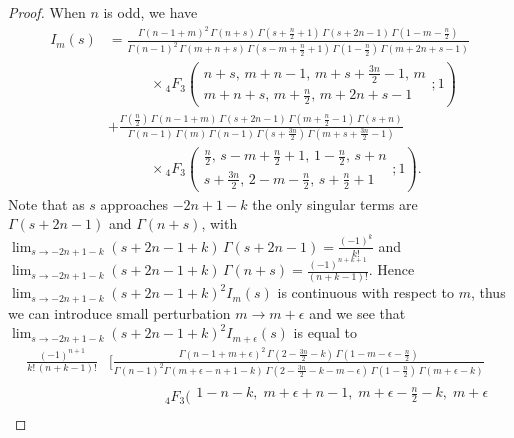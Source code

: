 \documentclass{article}
\theoremstyle{boldremark}
\renewcommand\[{\begin{equation}}
\renewcommand\]{\end{equation}}
\theoremstyle{definition}
\numberwithin{equation}{section}
\begin{document}
\begin{proof}
    When $n$ is odd, we have 
    \begin{align} 
I_m(s) &= \frac{\Gamma(n-1 + m)^2 \, \Gamma(n+s) \, \Gamma(s+\frac{n}{2}+1) \, \Gamma(s+2n-1) \, \Gamma(1 - m - \frac{n}{2})}{\Gamma(n-1)^2\,\Gamma(m+n+s) \, \Gamma(s - m + \frac{n}{2} + 1) \, \Gamma(1 - \frac{n}{2}) \, \Gamma(m + 2n + s - 1)} \nonumber \\
&\qquad \quad \times {}_4F_3 \left( \begin{matrix} n + s, \, m + n - 1, \, m + s + \frac{3n}{2} - 1, \, m \\ m + n + s, \, m + \frac{n}{2}, \, m + 2n + s - 1 \end{matrix} ; 1 \right) \nonumber \\[1em]
& + \frac{\Gamma(\frac{n}{2}) \, \Gamma(n-1+m)\, \Gamma(s+2n-1) \, \Gamma(m+\frac{n}{2}-1) \, \Gamma(s+n)}{\Gamma(n-1)\,\Gamma(m) \, \Gamma(n-1) \, \Gamma(s+\frac{3n}{2}) \, \Gamma(m+s+\frac{3n}{2}-1)} \nonumber \\
&\qquad \quad \times {}_4F_3 \left( \begin{matrix} \frac{n}{2}, \, s - m + \frac{n}{2} + 1, \, 1 - \frac{n}{2}, \, s + n \\ s + \frac{3n}{2}, \, 2 - m - \frac{n}{2}, \, s + \frac{n}{2} + 1 \end{matrix} ; 1 \right) \nonumber.
\end{align}
Note that as $s$ approaches $-2n +1 -k$ the only singular terms are $\Gamma(s + 2n -1)$ and $\Gamma(n+s)$, with $\lim_{s \to -2n+1 - k} (s + 2n-1 +k)\,\Gamma(s + 2n -1) = \frac{(-1)^k}{k!}$ and $\lim_{s \to -2n+1 - k} (s + 2n-1 +k)\,\Gamma(n+s) = \frac{(-1)^{n+k+1}}{(n+k-1)!}$. 
Hence $ \lim_{s \to -2n+1 - k} (s + 2n-1 +k)^2 I_m(s)$ is continuous with respect to $m$, thus we can introduce small perturbation $m \to m + \epsilon$ and we see that $\lim_{s \to -2n+1-k} (s+2n-1+k)^2 I_{m+\epsilon}(s)$ is equal to
\begin{align}\nonumber
\frac{(-1)^{n+1}}{k!\,(n+k-1)!}&
\Bigg[
\frac{
\Gamma(n-1 + m + \epsilon)^{2}\,
\Gamma\!\left(2-\frac{3n}{2}-k\right)\,
\Gamma\!\left(1-m-\epsilon-\frac{n}{2}\right)
}{\Gamma(n-1)^2
\Gamma\!\left(m+\epsilon-n+1-k\right)\,
\Gamma\!\left(2-\frac{3n}{2}-k-m-\epsilon\right)\,
\Gamma\!\left(1-\frac{n}{2}\right)\,
\Gamma\!\left(m+\epsilon-k\right)
}
\\\label{Liche_7}
&\qquad\qquad
{}_4F_3\!\Biggl(
\begin{matrix}
1-n-k,\; m+\epsilon+n-1,\; m+\epsilon-\frac{n}{2}-k,\; m+\epsilon \\[4 pt]

\end{matrix}
\end{align}
\end{proof}
\end{document}
